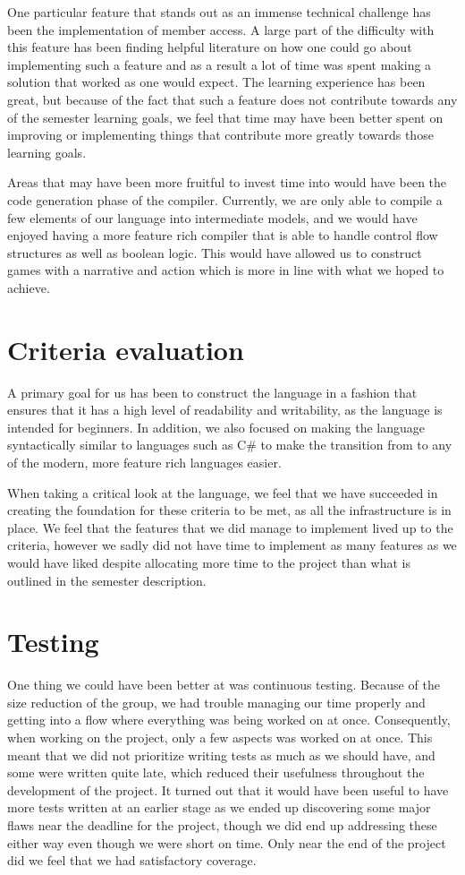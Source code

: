 One particular feature that stands out as an immense technical challenge has been the implementation of member access. A large part of the difficulty with this feature has been finding helpful literature on how one could go about implementing such a feature and as a result a lot of time was spent making a solution that worked as one would expect. The learning experience has been great, but because of the fact that such a feature does not contribute towards any of the semester learning goals, we feel that time may have been better spent on improving or implementing things that contribute more greatly towards those learning goals. 

Areas that may have been more fruitful to invest time into would have been the code generation phase of the compiler. Currently, we are only able to compile a few elements of our language into intermediate models, and we would have enjoyed having a more feature rich compiler that is able to handle control flow structures as well as boolean logic. This would have allowed us to construct games with a narrative and action which is more in line with what we hoped to achieve.

\section{Criteria evaluation}
A primary goal for us has been to construct the language in a fashion that ensures that it has a high level of readability and writability, as the language is intended for beginners. In addition, we also focused on making the language syntactically similar to languages such as C\# to make the transition from \dazel{} to any of the modern, more feature rich languages easier. 

When taking a critical look at the language, we feel that we have succeeded in creating the foundation for these criteria to be met, as all the infrastructure is in place. 
We feel that the features that we did manage to implement lived up to the criteria, however we sadly did not have time to implement as many features as we would have liked despite allocating more time to the project than what is outlined in the semester description.

\section{Testing}
One thing we could have been better at was continuous testing. 
Because of the size reduction of the group, we had trouble managing our time properly and getting into a flow where everything was being worked on at once.
Consequently, when working on the project, only a few aspects was worked on at once.
This meant that we did not prioritize writing tests as much as we should have, and some were written quite late, which reduced their usefulness throughout the development of the project. 
It turned out that it would have been useful to have more tests written at an earlier stage as we ended up discovering some major flaws near the deadline for the project, though we did end up addressing these either way even though we were short on time. 
Only near the end of the project did we feel that we had satisfactory coverage.

